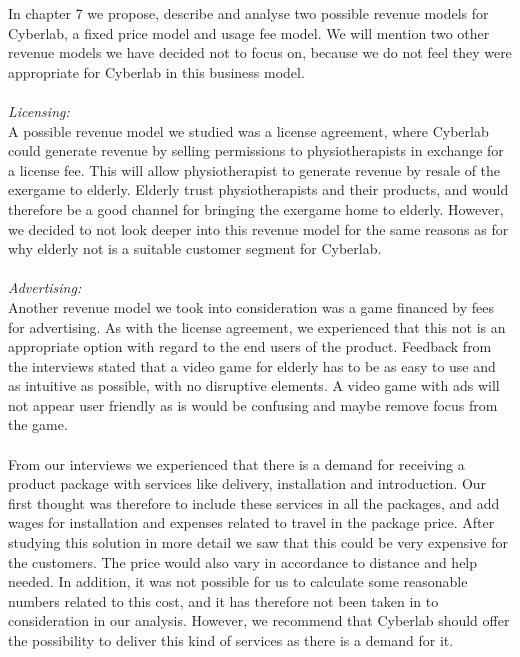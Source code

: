 In chapter 7 we propose, describe and analyse two possible revenue models for Cyberlab, a fixed price model and usage fee model. We will mention two other revenue models we have decided not to focus on, because we do not feel they were appropriate for Cyberlab in this business model. \\ \\
\emph{Licensing:} \\ A possible revenue model we studied was a license agreement, where Cyberlab could generate revenue by selling permissions to physiotherapists in exchange for a license fee. This will allow physiotherapist to generate revenue by resale of the exergame to elderly. Elderly trust physiotherapists and their products, and would therefore be a good channel for bringing the exergame home to elderly. However, we decided to not look deeper into this revenue model for the same reasons as for why elderly not is a suitable customer segment for Cyberlab.\\ \\
\emph{Advertising:}\\ Another revenue model we took into consideration was a game financed by fees for advertising. As with the license agreement, we experienced that this not is an appropriate option with regard to the end users of the product. Feedback from the interviews stated that a video game for elderly has to be as easy to use and as intuitive as possible, with no disruptive elements. A video game with ads will not appear user friendly as is would be confusing and maybe remove focus from the game.\\ \\
From our interviews we experienced that there is a demand for receiving a product package with services like delivery, installation and introduction. Our first thought was therefore to include these services in all the packages, and add wages for installation and expenses related to travel in the package price. After studying this solution in more detail we saw that this could be very expensive for the customers. The price would also vary in accordance to distance and help needed. In addition, it was not possible for us to calculate some reasonable numbers related to this cost, and it has therefore not been taken in to consideration in our analysis. However, we recommend that Cyberlab should offer the possibility to deliver this kind of services as there is a demand for it. \\ \\   
